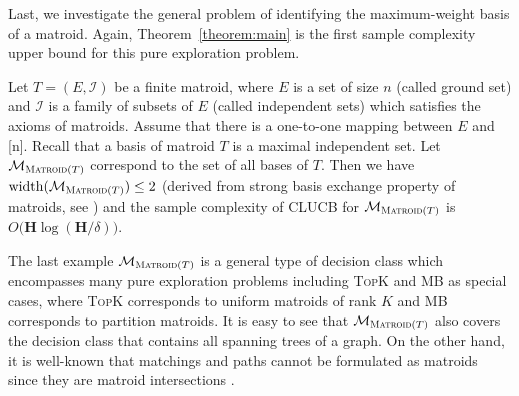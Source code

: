 \documentclass{article}
\newcommand{\junk}[1]{}
\newcommand{\Algorithm}{{\small \textsf{CLUCB}}\xspace}
\newcommand{\M}{\mathcal M}
\newcommand{\del}{\backslash}
\DeclareMathOperator{\rank}{width}
\newcommand{\MultiIdent}{\textsc{TopK}\xspace}
\newcommand{\MultiBandit}{\textsc{MB}\xspace}
\newcommand{\Matroid}{\textsc{Matroid}\xspace}
\newcommand{\Path}{\textsc{Path}\xspace}
\begin{document}
Last, we investigate the general problem of identifying the maximum-weight basis of a matroid.
Again, Theorem~\ref{theorem:main} is the first sample complexity upper bound for this pure exploration problem.
\begin{example}[Matroids]
\label{example:matroid}
Let $T=(E,\mathcal I)$ be a finite matroid, where $E$ is a set of size $n$ (called ground set) and $\mathcal I$ is a family of subsets of $E$ (called independent sets) which satisfies the axioms of matroids.
Assume that there is a one-to-one mapping between $E$ and [n].
Recall that a basis of matroid $T$ is a maximal independent set.
Let $\M_{\Matroid(T)}$ correspond to the set of all bases of $T$.
Then we have $\rank(\M_{\Matroid(T)}) \le 2$ (derived from strong basis exchange property of matroids, see ) and the sample complexity of \Algorithm for $\M_{\Matroid(T)}$ is $O\big(\mathbf H \log(\mathbf H/\delta)\big)$.
\end{example}
The last example $\M_{\Matroid(T)}$ is a general type of decision class which encompasses many pure exploration problems including \MultiIdent and \MultiBandit as special cases, where \MultiIdent corresponds to uniform matroids of rank $K$ and \MultiBandit corresponds to partition matroids.
It is easy to see that $\M_{\Matroid(T)}$ also covers the decision class that contains all spanning trees of a graph.
On the other hand, it is well-known that matchings and paths cannot be formulated as matroids since they are matroid intersections \citep{oxley2006matroid}.

\junk{
The bounds on the width of our examples decision classes are proven by constructing the exchange classes. 
In fact, these exchange classes correspond to natural combinatorial structures. 
We illustrate our constructions in \Cref{fig:exchange}.


}

\end{document}
